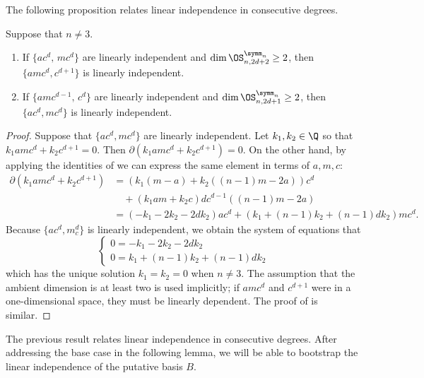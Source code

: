 \documentclass{amsart}
\begin{document}
The following proposition relates linear independence in consecutive degrees. 

\begin{lemma} \label{lemma:ConsecutiveDegreeLI}
Suppose that $n \neq  3$.
    \begin{enumerate}
        \item  If $\{ac^d,\, mc^d\}$ are linearly independent 
        and $\dim \OS_{n,2d+2}^{\symm_n} \geq 2$, then $\{amc^d, c^{d+1}\}$ is linearly independent.
        \item \label{prop:EvenImpliesOddLI} If $\{amc^{d-1},\, c^d\}$ are linearly independent and $\dim \OS_{n,2d+1}^{\symm_n} \geq 2$, then $\{ac^d, mc^d\}$ is linearly independent.
    \end{enumerate}
\end{lemma}

\begin{proof}
Suppose that $\{ac^d, mc^d\}$ are linearly independent.
Let $k_1, k_2 \in \Q$ so that $k_1 amc^d + k_2 c^{d+1} = 0$.
Then $\partial(k_1 amc^d + k_2 c^{d+1}) = 0$.
On the other hand, by applying the identities of  we can express the same element in terms of $a,m,c$: 
\begin{align*}
    \partial(k_1 amc^d + k_2 c^{d+1})
    &= \left(k_1(m-a) + k_2((n-1)m - 2a) \right) c^d \\
    &\quad +  \left(k_1 am + k_2c \right) d c^{d-1}((n-1)m - 2a)\\
    &=  \left ( -k_1-2k_2-2dk_2\right ) ac^d + \left (k_1 +(n-1)k_2+ (n-1)dk_2 \right ) mc^d.
\end{align*}
Because $\{ac^d, m_c^d\}$ is linearly independent, we obtain the system of equations that
\[
\begin{cases}
    0 = -k_1 - 2k_2 - 2d k_2 \\
    0 = k_1 + (n-1)k_2 + (n-1)dk_2
\end{cases}
\]
which has the unique solution $k_1=k_2=0$ when $n \neq 3$.
The assumption that the ambient dimension is at least two is used implicitly; if $amc^d$ and $c^{d+1}$ were in a one-dimensional space, they must be linearly dependent.
The proof of  is similar.
\end{proof}

The previous result relates linear independence in consecutive degrees.
After addressing the base case in the following lemma, we will be able to bootstrap the linear independence of the putative basis $B$.
\end{document}
